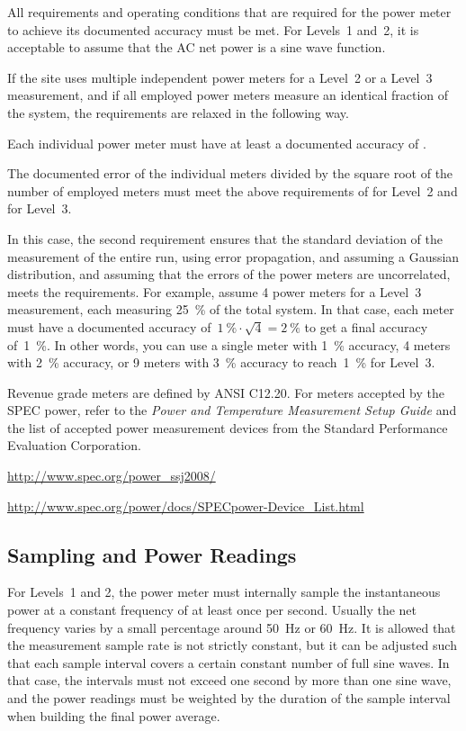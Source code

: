 All requirements and operating conditions that are required for the power meter to achieve its documented accuracy must be met.
For Levels~1 and~2, it is acceptable to assume that the AC net power is a sine wave function.

If the site uses multiple independent power meters for a Level~2 or a Level~3 measurement, and if all employed power meters measure an identical fraction of the system, the requirements are relaxed in the following way.
\begin{packed_item}
\item 
Each individual power meter must have at least a documented accuracy of \SpecAccuracyMeter{}.
\item
The documented error of the individual meters divided by the square root of the number of employed meters must meet the above requirements of \SpecAccuracyLTwo{} for Level~2 and \SpecAccuracyLThree{} for Level~3.
\end{packed_item}
In this case, the second requirement ensures that the standard deviation of the measurement of the entire run, using error propagation, and assuming a Gaussian distribution, and assuming that the errors of the power meters are uncorrelated, meets the requirements.
For example, assume 4 power meters for a Level~3 measurement, each measuring \SI{25}{\percent} of the total system.
In that case, each meter must have a documented accuracy of~$\SI{1}{\percent} \cdot \sqrt{4} = \SI{2}{\percent}$ to get a final accuracy of~\SI{1}{\percent}.
In other words, you can use a single meter with \SI{1}{\percent} accuracy, \num{4} meters with \SI{2}{\percent} accuracy, or \num{9} meters with \SI{3}{\percent} accuracy to reach~\SI{1}{\percent} for Level~3.

Revenue grade meters are defined by ANSI C12.20.
For meters accepted by the SPEC power, refer to the {\itshape Power and Temperature Measurement Setup Guide \/} and the list of accepted power measurement devices from the Standard Performance Evaluation Corporation.
\begin{packed_item}
\item 
\url{http://www.spec.org/power_ssj2008/}
\item
\url{http://www.spec.org/power/docs/SPECpower-Device_List.html }
\end{packed_item}

\subsection{Sampling and Power Readings}
For Levels~1 and 2, the power meter must internally sample the instantaneous power at a constant frequency of at least once per second.
Usually the net frequency varies by a small percentage around \SI{50}{\hertz} or \SI{60}{\hertz}.
It is allowed that the measurement sample rate is not strictly constant, but it can be adjusted such that each sample interval covers a certain constant number of full sine waves.
In that case, the intervals must not exceed one second by more than one sine wave, and the power readings must be weighted by the duration of the sample interval when building the final power average.

